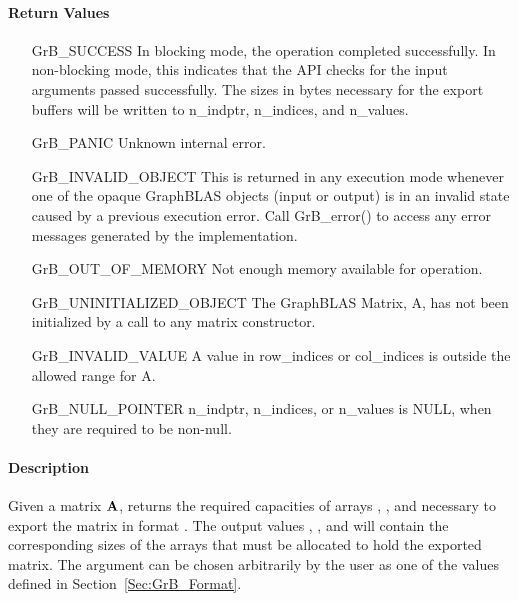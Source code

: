 \paragraph{Return Values}

\begin{itemize}[leftmargin=2.3in]
    \item[{\sf GrB\_SUCCESS}]         In blocking mode, the operation completed
    successfully. In non-blocking mode, this indicates that the API checks 
    for the input arguments passed successfully. The sizes in bytes necessary
    for the export buffers will be written to {\sf n\_indptr}, {\sf n\_indices},
    and {\sf n\_values}.

    \item[{\sf GrB\_PANIC}]           Unknown internal error.
    
    \item[{\sf GrB\_INVALID\_OBJECT}] This is returned in any execution mode 
    whenever one of the opaque GraphBLAS objects (input or output) is in an invalid 
    state caused by a previous execution error.  Call {\sf GrB\_error()} to access 
    any error messages generated by the implementation.

    \item[{\sf GrB\_OUT\_OF\_MEMORY}] Not enough memory available for operation.
    
    \item[{\sf GrB\_UNINITIALIZED\_OBJECT}]  The GraphBLAS Matrix, {\sf A}, has 
    not been initialized by a call to any matrix constructor.

    \item[{\sf GrB\_INVALID\_VALUE}] A value in {\sf row\_indices} or
    {\sf col\_indices} is outside the allowed range for {\sf A}.
    
    \item[{\sf GrB\_NULL\_POINTER}]  {\sf n\_indptr}, 
    {\sf n\_indices}, or {\sf n\_values} is {\sf NULL},
    when they are required to be non-null.
\end{itemize}

\paragraph{Description}

Given a matrix ${\bf A}$, returns the required capacities of arrays ,
, and  necessary to export the matrix in format .
The output values , , and  will
contain the corresponding sizes of the arrays that must be allocated to hold
the exported matrix.  The argument  can be chosen arbitrarily by the
user as one of the values defined in Section~\ref{Sec:GrB_Format}.

